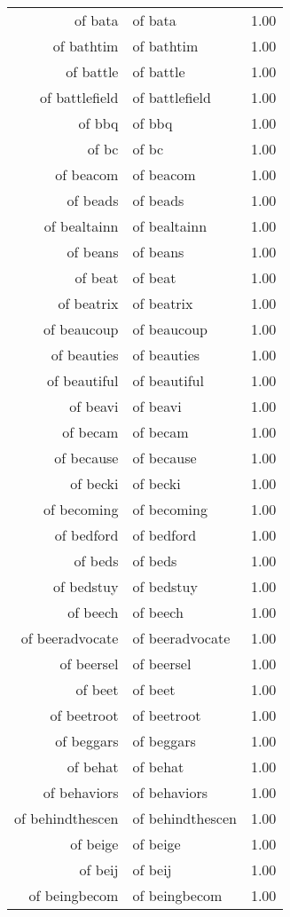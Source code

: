 \begin{table}[ht]
\begin{tabular}{rlr}
  of bata & of bata & 1.00 \\ 
  of bathtim & of bathtim & 1.00 \\ 
  of battle & of battle & 1.00 \\ 
  of battlefield & of battlefield & 1.00 \\ 
  of bbq & of bbq & 1.00 \\ 
  of bc & of bc & 1.00 \\ 
  of beacom & of beacom & 1.00 \\ 
  of beads & of beads & 1.00 \\ 
  of bealtainn & of bealtainn & 1.00 \\ 
  of beans & of beans & 1.00 \\ 
  of beat & of beat & 1.00 \\ 
  of beatrix & of beatrix & 1.00 \\ 
  of beaucoup & of beaucoup & 1.00 \\ 
  of beauties & of beauties & 1.00 \\ 
  of beautiful & of beautiful & 1.00 \\ 
  of beavi & of beavi & 1.00 \\ 
  of becam & of becam & 1.00 \\ 
  of because & of because & 1.00 \\ 
  of becki & of becki & 1.00 \\ 
  of becoming & of becoming & 1.00 \\ 
  of bedford & of bedford & 1.00 \\ 
  of beds & of beds & 1.00 \\ 
  of bedstuy & of bedstuy & 1.00 \\ 
  of beech & of beech & 1.00 \\ 
  of beeradvocate & of beeradvocate & 1.00 \\ 
  of beersel & of beersel & 1.00 \\ 
  of beet & of beet & 1.00 \\ 
  of beetroot & of beetroot & 1.00 \\ 
  of beggars & of beggars & 1.00 \\ 
  of behat & of behat & 1.00 \\ 
  of behaviors & of behaviors & 1.00 \\ 
  of behindthescen & of behindthescen & 1.00 \\ 
  of beige & of beige & 1.00 \\ 
  of beij & of beij & 1.00 \\ 
  of beingbecom & of beingbecom & 1.00 \\ 

\end{tabular}
\end{table}
